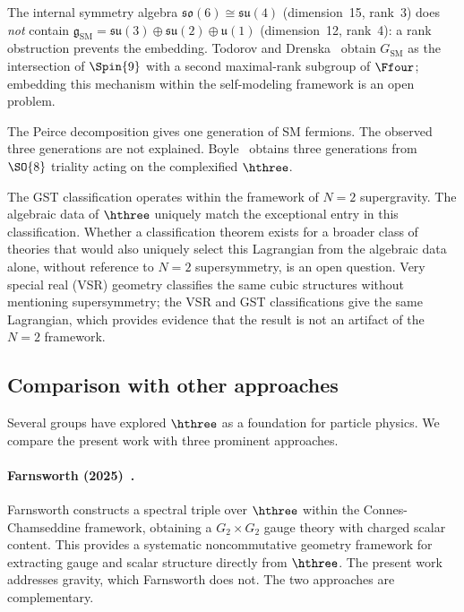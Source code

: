 \begin{description}[style=nextline]
\item[G8: $\mathfrak{so}(6) \to \mathfrak{g}_{\mathrm{SM}}$.]
  The internal symmetry algebra $\mathfrak{so}(6) \cong \mathfrak{su}(4)$
  (dimension~15, rank~3) does \emph{not} contain
  $\mathfrak{g}_{\mathrm{SM}} = \mathfrak{su}(3) \oplus \mathfrak{su}(2)
  \oplus \mathfrak{u}(1)$ (dimension~12, rank~4): a rank obstruction
  prevents the embedding. Todorov and
  Drenska~\cite{TodorovDrenska2018} obtain $G_{\mathrm{SM}}$ as the
  intersection of $\Spin{9}$ with a second maximal-rank subgroup
  of $\Ffour$; embedding this mechanism within the self-modeling
  framework is an open problem.

\item[G9: Three generations.]
  The Peirce decomposition gives one generation of SM fermions.
  The observed three generations are not explained. Boyle~\cite{Boyle2020}
  obtains three generations from $\SO{8}$ triality acting on the
  complexified $\hthree$.

\item[G10: Broader classification scope.]
  The GST classification operates within the framework of $N{=}2$
  supergravity. The algebraic data of $\hthree$ uniquely match the
  exceptional entry in this classification. Whether a classification
  theorem exists for a broader class of theories that would also uniquely
  select this Lagrangian from the algebraic data alone, without reference
  to $N{=}2$ supersymmetry, is an open question. Very special real (VSR)
  geometry classifies the same cubic structures without mentioning
  supersymmetry; the VSR and GST classifications give the same
  Lagrangian, which provides evidence that the result is not an artifact
  of the $N{=}2$ framework.
\end{description}

\subsection{Comparison with other approaches}

Several groups have explored $\hthree$ as a foundation for particle
physics. We compare the present work with three prominent approaches.

\paragraph{Farnsworth (2025)~\cite{Farnsworth2025}.}
Farnsworth constructs a spectral triple over $\hthree$ within the
Connes-Chamseddine framework, obtaining a $G_2 \times G_2$ gauge theory
with charged scalar content. This provides a systematic noncommutative
geometry framework for extracting gauge and scalar structure directly
from $\hthree$. The present work addresses gravity, which Farnsworth
does not. The two approaches are complementary.

